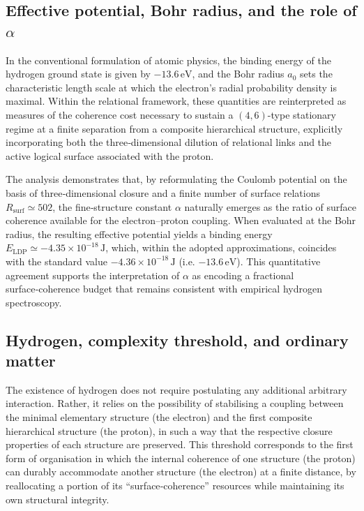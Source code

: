 \documentclass[11pt,a4paper]{article}
\begin{document}
\subsection{Effective potential, Bohr radius, and the role of \texorpdfstring{\(\alpha\)}{alpha}}

In the conventional formulation of atomic physics, the binding energy of the hydrogen ground state is given by \(-13.6\,\mathrm{eV}\), and the Bohr radius \(a_{0}\) sets the characteristic length scale at which the electron’s radial probability density is maximal. Within the relational framework, these quantities are reinterpreted as measures of the coherence cost necessary to sustain a \((4,6)\)-type stationary regime at a finite separation from a composite hierarchical structure, explicitly incorporating both the three‑dimensional dilution of relational links and the active logical surface associated with the proton.

The analysis demonstrates that, by reformulating the Coulomb potential on the basis of three‑dimensional closure and a finite number of surface relations \(R_{\mathrm{surf}} \simeq 502\), the fine‑structure constant \(\alpha\) naturally emerges as the ratio of surface coherence available for the electron–proton coupling. When evaluated at the Bohr radius, the resulting effective potential yields a binding energy \(E_{\mathrm{LDP}} \simeq -4.35 \times 10^{-18}\,\mathrm{J}\), which, within the adopted approximations, coincides with the standard value \(-4.36 \times 10^{-18}\,\mathrm{J}\) (i.e. \(-13.6\,\mathrm{eV}\)). This quantitative agreement supports the interpretation of \(\alpha\) as encoding a fractional surface‑coherence budget that remains consistent with empirical hydrogen spectroscopy.

\subsection{Hydrogen, complexity threshold, and ordinary matter}
The existence of hydrogen does not require postulating any additional arbitrary interaction. Rather, it relies on the possibility of stabilising a coupling between the minimal elementary structure (the electron) and the first composite hierarchical structure (the proton), in such a way that the respective closure properties of each structure are preserved. This threshold corresponds to the first form of organisation in which the internal coherence of one structure (the proton) can durably accommodate another structure (the electron) at a finite distance, by reallocating a portion of its “surface‑coherence” resources while maintaining its own structural integrity.
\end{document}

